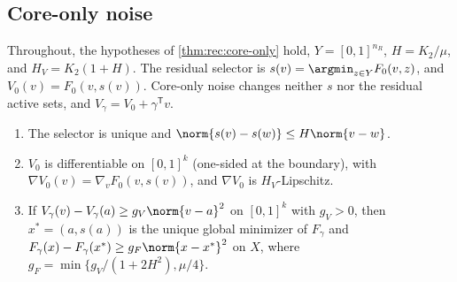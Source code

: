 \subsection{Core-only noise}\label{app:rec:core-only}

Throughout, the hypotheses of \cref{thm:rec:core-only} hold, $Y=[0,1]^{n_R}$,
$H=K_2/\mu$, and $H_V=K_2(1+H)$. The residual selector is
$s(v)=\argmin_{z\in Y}F_0(v,z)$, and $V_0(v)=F_0(v,s(v))$. Core-only noise
changes neither $s$ nor the residual active sets, and
$V_\gamma=V_0+\gamma^{\mathsf T}v$.

\begin{lemma}\label{lem:app:rec:lift}
\leavevmode
\begin{enumerate}[label=(\alph*)]
\item The selector is unique and $\norm{s(v)-s(w)}\le H\norm{v-w}$.
\item $V_0$ is differentiable on $[0,1]^k$ (one-sided at the boundary), with
$\nabla V_0(v)=\nabla_vF_0(v,s(v))$, and $\nabla V_0$ is $H_V$-Lipschitz.
\item If $V_\gamma(v)-V_\gamma(a)\ge g_V\norm{v-a}^2$ on $[0,1]^k$ with
$g_V>0$, then $x^*=(a,s(a))$ is the unique global minimizer of $F_\gamma$ and
$F_\gamma(x)-F_\gamma(x^*)\ge g_F\norm{x-x^*}^2$ on $X$, where
$g_F=\min\{g_V/(1+2H^2),\mu/4\}$.
\end{enumerate}
\end{lemma}

